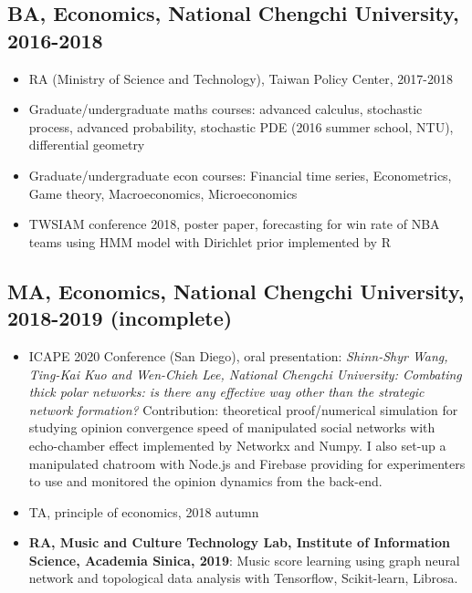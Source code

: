 \documentclass[11pt]{article}
\begin{document}
\begin{multicols*}{2}
\subsection*{BA, Economics, National Chengchi University, 2016-2018}

    \begin{itemize}[noitemsep]
        \item RA (Ministry of Science and Technology), Taiwan Policy Center, 2017-2018
        \item Graduate/undergraduate maths courses: advanced calculus, stochastic process, advanced probability, stochastic PDE (2016 summer school, NTU), differential geometry
        \item Graduate/undergraduate econ courses: Financial time series, Econometrics, Game theory, Macroeconomics, Microeconomics
        \item TWSIAM conference 2018, poster paper, forecasting for win rate of NBA teams using HMM model with Dirichlet prior implemented by R
    \end{itemize}


\subsection*{MA, Economics, National Chengchi University, 2018-2019 (incomplete)}

    \begin{itemize}[noitemsep]
        \item ICAPE 2020 Conference (San Diego), oral presentation: \textit{Shinn-Shyr Wang, Ting-Kai Kuo and Wen-Chieh Lee, National Chengchi University: Combating thick polar networks: is there any effective way other than the strategic network formation?} Contribution: theoretical proof/numerical simulation for studying opinion convergence speed of manipulated social networks with echo-chamber effect implemented by Networkx and Numpy. I also set-up a manipulated chatroom with Node.js and Firebase providing for experimenters to use and monitored the opinion dynamics from the back-end.
        \item TA, principle of economics, 2018 autumn
    
        \item \textbf{RA, Music and Culture Technology Lab, Institute of Information Science, Academia Sinica, 2019}: Music score learning using graph neural network and topological data analysis with Tensorflow, Scikit-learn, Librosa.
        
    \end{itemize}


\end{multicols*}
\end{document}
